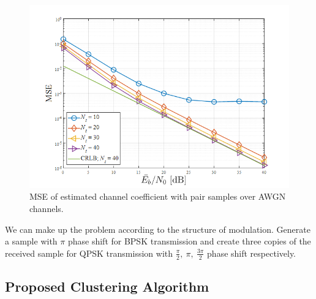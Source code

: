 \begin{figure}[t!]
 \centering
 \includegraphics[width=15cm]{fig/sample_size_analysis.png}
 \caption{MSE of estimated channel coefficient with pair samples over AWGN channels.}
 \label{fig:sample_size_analysis}
\end{figure}


We can make up the problem according to the structure of modulation. Generate a sample with $\pi$ phase shift for BPSK transmission and create three copies of the received sample for QPSK transmission with $\frac{\pi}{2}, \ \pi ,\ \frac{3\pi}{2} $ phase shift respectively.

\subsection{Proposed Clustering Algorithm}

